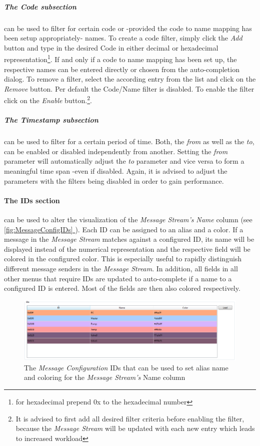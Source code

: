 \documentclass[12pt,a4paper]{scrartcl}
\newcommand*{\fullref}[1]{\hyperref[{#1}]{\autoref*{#1} \nameref*{#1}}} %
\begin{document}
\subparagraph{The Code subsection} can be used to filter for certain code or -provided the code to name mapping has been setup appropriately- names. To create a code filter, simply click the \textit{Add} button and type in the desired Code in either decimal or hexadecimal representation\footnote{for hexadecimal prepend 0x to the hexadecimal number}. If and only if a code to name mapping has been set up, the respective names can be entered directly or chosen from the auto-completion dialog. To remove a filter, select the according entry from the list and click on the \textit{Remove} button. Per default the Code/Name filter is disabled. To enable the filter click on the \textit{Enable} button.\footnote{It is advised to first add all desired filter criteria before enabling the filter, because the \textit{Message Stream} will be updated with each new entry which leads to increased workload}.

\subparagraph{The Timestamp subsection} can be used to filter for a certain period of time. Both, the \textit{from} as well as the \textit{to}, can be enabled or disabled independently from another. Setting the \textit{from} parameter will automatically adjust the \textit{to} parameter and vice versa to form a meaningful time span -even if disabled. Again, it is advised to adjust the parameters with the filters being disabled in order to gain performance.

\FloatBarrier
\paragraph{The IDs section} can be used to alter the visualization of the \textit{Message Stream's} \textit{Name} column (see \fullref{fig:MessageConfigIDs}). Each ID can be assigned to an alias and a color. If a message in the \textit{Message Stream} matches against a configured ID, its name will be displayed instead of the numerical representation and the respective field will be colored in the configured color. This is especially useful to rapidly distinguish different message senders in the \textit{Message Stream}. In addition, all fields in all other menus that require IDs are updated to auto-complete if a name to a configured ID is entered. Most of the fields are then also colored respectively.

\begin{figure}
	\centering
	\includegraphics[width=\linewidth,keepaspectratio]{Graphics/MessageConfigIDs}
	\caption[Message Configuration IDs]{The \textit{Message Configuration} IDs that can be used to set alias name and coloring for the \textit{Message Stream's} Name column}
	\label{fig:MessageConfigIDs}
\end{figure}
\end{document}
